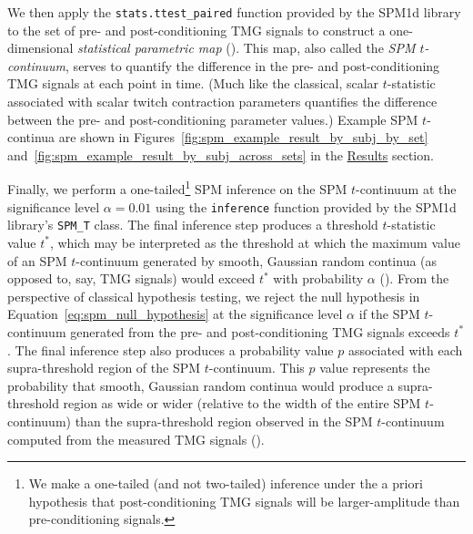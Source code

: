 \documentclass[utf8]{FrontiersinHarvard}
\begin{document}
We then apply the \texttt{stats.ttest\_paired} function provided by the SPM1d library to the set of pre- and post-conditioning TMG signals to construct a one-dimensional \textit{statistical parametric map} (\cite{pataky-spm1d}).
This map, also called the \textit{SPM $ t $-continuum}, serves to quantify the difference in the pre- and post-conditioning TMG signals at each point in time.
(Much like the classical, scalar $ t $-statistic associated with scalar twitch contraction parameters quantifies the difference between the pre- and post-conditioning parameter values.)
Example SPM $ t $-continua are shown in Figures~\ref{fig:spm_example_result_by_subj_by_set} and~\ref{fig:spm_example_result_by_subj_across_sets} in the \hyperref[s:results]{Results} section.

Finally, we perform a one-tailed\footnote{We make a one-tailed (and not two-tailed) inference under the a priori hypothesis that post-conditioning TMG signals will be larger-amplitude than pre-conditioning signals.} SPM inference on the SPM $ t $-continuum at the significance level $ \alpha = 0.01 $ using the \texttt{inference} function provided by the SPM1d library's \texttt{SPM\_T} class.
The final inference step produces a threshold $ t $-statistic value $ t^{*} $, which may be interpreted as the threshold at which the maximum value of an SPM $ t $-continuum generated by smooth, Gaussian random continua (as opposed to, say, TMG signals) would exceed $ t^{*} $ with probability $ \alpha $ (\cite{pataky-spm1d}).
From the perspective of classical hypothesis testing, we reject the null hypothesis in Equation~\ref{eq:spm_null_hypothesis} at the significance level $ \alpha $ if the SPM $ t $-continuum generated from the pre- and post-conditioning TMG signals exceeds $ t^{*} $.
The final inference step also produces a probability value $ p $ associated with each supra-threshold region of the SPM $ t $-continuum.
This $ p $ value represents the probability that smooth, Gaussian random continua would produce a supra-threshold region as wide or wider (relative to the width of the entire SPM $ t $-continuum) than the supra-threshold region observed in the SPM $ t $-continuum computed from the measured TMG signals (\cite{pataky-spm1d}).

\end{document}
